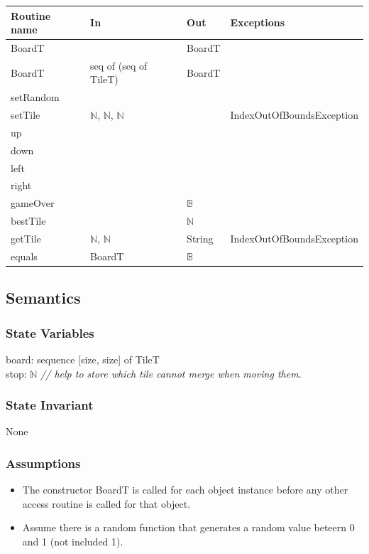 \documentclass[12pt]{article}
\begin{document}
\begin{tabular}{| l | l | l | l |}
\hline
\textbf{Routine name} & \textbf{In} & \textbf{Out} & \textbf{Exceptions}\\
\hline
BoardT & ~ & BoardT & \\
\hline
BoardT & seq of (seq of TileT) & BoardT & \\
\hline
setRandom & ~ & ~ & \\
\hline
setTile & $\mathbb{N}$, $\mathbb{N}$, $\mathbb{N}$ & ~ & IndexOutOfBoundsException\\
\hline
up & ~ & ~ & \\
\hline
down & ~ & ~ & \\
\hline
left & ~ & ~ & \\
\hline
right & ~ & ~ & \\
\hline
gameOver & ~ & $\mathbb{B}$ & \\
\hline
bestTile & ~ & $\mathbb{N}$ & \\
\hline
getTile & $\mathbb{N}$, $\mathbb{N}$ & String & IndexOutOfBoundsException\\
\hline
equals & BoardT & $\mathbb{B}$ & \\
\hline
\end{tabular}

\subsection* {Semantics}

\subsubsection* {State Variables}

board: sequence [size, size] of TileT \\
stop: $\mathbb{N}$ 
\textit{// help to store which tile cannot merge when moving them.}

\subsubsection* {State Invariant}

None

\subsubsection* {Assumptions}

\begin{itemize}
  \item The constructor BoardT is called for each object instance before any other access routine is called for that object. 
  \item Assume there is a random function that generates a random value beteern 0 and 1 (not included 1).
\end{itemize}
\end{document}
